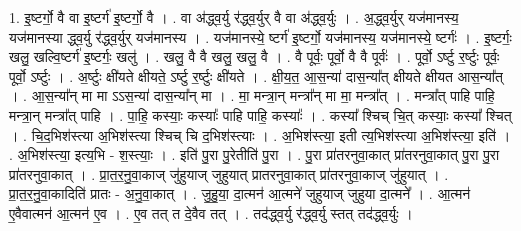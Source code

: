 \documentclass[17pt]{extarticle}
\begin{document}
1. इ॒ष्टर्गो॒ वै वा इ॒ष्टर्ग॑ इ॒ष्टर्गो॒ वै । . वा अ॑द्ध्व॒र्यु र॑द्ध्व॒र्युर् वै वा अ॑द्ध्व॒र्युः । . अ॒द्ध्व॒र्युर् यज॑मानस्य॒ यज॑मानस्या द्ध्व॒र्यु र॑द्ध्व॒र्युर् यज॑मानस्य । . यज॑मानस्ये॒ ष्टर्ग॑ इ॒ष्टर्गो॒ यज॑मानस्य॒ यज॑मानस्ये॒ ष्टर्गः॑ । . इ॒ष्टर्गः॒ खलु॒ खल्वि॒ष्टर्ग॑ इ॒ष्टर्गः॒ खलु॑ । . खलु॒ वै वै खलु॒ खलु॒ वै । . वै पूर्वः॒ पूर्वो॒ वै वै पूर्वः॑ । . पूर्वो॒ ऽर्ष्टु र॒र्ष्टुः पूर्वः॒ पूर्वो॒ ऽर्ष्टुः । . अ॒र्ष्टुः क्षी॑यते क्षीयते॒ ऽर्ष्टु र॒र्ष्टुः क्षी॑यते । . क्षी॒य॒त॒ आ॒स॒न्या॑ दास॒न्या᳚त् क्षीयते क्षीयत आस॒न्या᳚त् । . आ॒स॒न्या᳚न् मा मा ऽऽस॒न्या॑ दास॒न्या᳚न् मा । . मा॒ मन्त्रा॒न् मन्त्रा᳚न् मा मा॒ मन्त्रा᳚त् । . मन्त्रा᳚त् पाहि पाहि॒ मन्त्रा॒न् मन्त्रा᳚त् पाहि । . पा॒हि॒ कस्याः॒ कस्याः᳚ पाहि पाहि॒ कस्याः᳚ । . कस्या᳚ श्चिच् चि॒त् कस्याः॒ कस्या᳚ श्चित् । . चि॒द॒भिश॑स्त्या अ॒भिश॑स्त्या श्चिच् चि द॒भिश॑स्त्याः । . अ॒भिश॑स्त्या॒ इती त्य॒भिश॑स्त्या अ॒भिश॑स्त्या॒ इति॑ । . अ॒भिश॑स्त्या॒ इत्य॒भि - श॒स्त्याः॒ । . इति॑ पु॒रा पु॒रेतीति॑ पु॒रा । . पु॒रा प्रा॑तरनुवा॒कात् प्रा॑तरनुवा॒कात् पु॒रा पु॒रा प्रा॑तरनुवा॒कात् । . प्रा॒त॒र॒नु॒वा॒काज् जु॑हुयाज् जुहुयात् प्रातरनुवा॒कात् प्रा॑तरनुवा॒काज् जु॑हुयात् । . प्रा॒त॒र॒नु॒वा॒कादिति॑ प्रातः - अ॒नु॒वा॒कात् । . जु॒हु॒या॒ दा॒त्मन॑ आ॒त्मने॑ जुहुयाज् जुहुया दा॒त्मने᳚ । . आ॒त्मन॑ ए॒वैवात्मन॑ आ॒त्मन॑ ए॒व । . ए॒व तत् त दे॒वैव तत् । . तद॑द्ध्व॒र्यु र॑द्ध्व॒र्यु स्तत् तद॑द्ध्व॒र्युः । \newline
\end{document}
